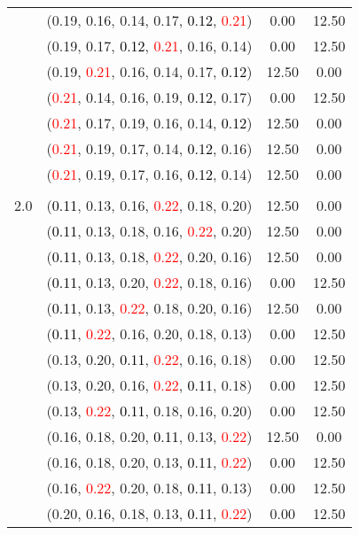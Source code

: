 \documentclass[10pt,a4paper]{report}
\begin{document}
\begin{center}
\begin{longtable}{clcc}
			&(0.19, 0.16, 0.14, 0.17, \textcolor{black}{0.12}, \textcolor{red}{0.21})&0.00&12.50\\
			&(0.19, 0.17, \textcolor{black}{0.12}, \textcolor{red}{0.21}, 0.16, 0.14)&0.00&12.50\\
			&(0.19, \textcolor{red}{0.21}, 0.16, 0.14, 0.17, \textcolor{black}{0.12})&12.50&0.00\\
			&(\textcolor{red}{0.21}, 0.14, 0.16, 0.19, \textcolor{black}{0.12}, 0.17)&0.00&12.50\\
			&(\textcolor{red}{0.21}, 0.17, 0.19, 0.16, 0.14, \textcolor{black}{0.12})&12.50&0.00\\
			&(\textcolor{red}{0.21}, 0.19, 0.17, 0.14, \textcolor{black}{0.12}, 0.16)&12.50&0.00\\
			&(\textcolor{red}{0.21}, 0.19, 0.17, 0.16, \textcolor{black}{0.12}, 0.14)&12.50&0.00\\
		&&&\\
		2.0			&(\textcolor{black}{0.11}, 0.13, 0.16, \textcolor{red}{0.22}, 0.18, 0.20)&12.50&0.00\\
			&(\textcolor{black}{0.11}, 0.13, 0.18, 0.16, \textcolor{red}{0.22}, 0.20)&12.50&0.00\\
			&(\textcolor{black}{0.11}, 0.13, 0.18, \textcolor{red}{0.22}, 0.20, 0.16)&12.50&0.00\\
			&(\textcolor{black}{0.11}, 0.13, 0.20, \textcolor{red}{0.22}, 0.18, 0.16)&0.00&12.50\\
			&(\textcolor{black}{0.11}, 0.13, \textcolor{red}{0.22}, 0.18, 0.20, 0.16)&12.50&0.00\\
			&(\textcolor{black}{0.11}, \textcolor{red}{0.22}, 0.16, 0.20, 0.18, 0.13)&0.00&12.50\\
			&(0.13, 0.20, \textcolor{black}{0.11}, \textcolor{red}{0.22}, 0.16, 0.18)&0.00&12.50\\
			&(0.13, 0.20, 0.16, \textcolor{red}{0.22}, \textcolor{black}{0.11}, 0.18)&0.00&12.50\\
			&(0.13, \textcolor{red}{0.22}, \textcolor{black}{0.11}, 0.18, 0.16, 0.20)&0.00&12.50\\
			&(0.16, 0.18, 0.20, \textcolor{black}{0.11}, 0.13, \textcolor{red}{0.22})&12.50&0.00\\
			&(0.16, 0.18, 0.20, 0.13, \textcolor{black}{0.11}, \textcolor{red}{0.22})&0.00&12.50\\
			&(0.16, \textcolor{red}{0.22}, 0.20, 0.18, \textcolor{black}{0.11}, 0.13)&0.00&12.50\\
			&(0.20, 0.16, 0.18, 0.13, \textcolor{black}{0.11}, \textcolor{red}{0.22})&0.00&12.50\\

\end{longtable}
\end{center}
\end{document}
